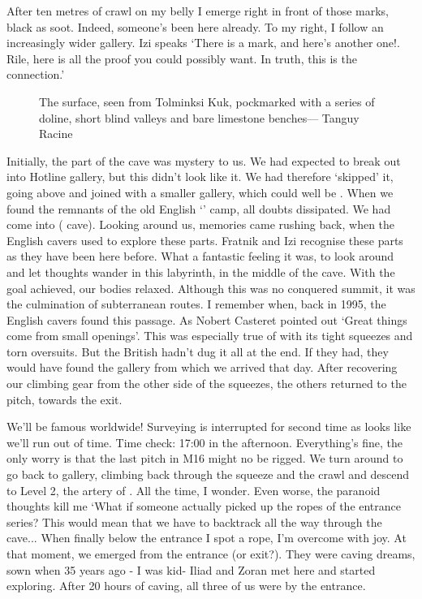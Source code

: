 After ten metres of crawl on my belly I emerge right in front of those marks, black as soot. Indeed, someone's been here already. To my right, I follow an increasingly wider gallery. Izi speaks `There is a mark, and here's another one!. Rile, here is all the proof you could possibly want. In truth, this is the connection.'


 \begin{figure}[t!]
\checkoddpage \ifoddpage \forcerectofloat \else \forceversofloat \fi
\centering
{}
\caption{The \protect{} surface, seen from Tolminksi Kuk, pockmarked with a series of doline, short blind valleys and bare limestone benches--- Tanguy Racine }
\label{mig seen from kuk}
\end{figure}


 Initially, the part of the cave was mystery to us. We had expected to break out into Hotline gallery, but this didn't look like it. We had therefore `skipped' it, going above and joined with a smaller gallery, which could well be . When we found the remnants of the old English `' camp, all doubts dissipated. We had come into  ( cave). Looking around us, memories came rushing back, when the English cavers used to explore these parts. Fratnik and Izi recognise these parts as they have been here before. What a fantastic feeling it was, to look around and let thoughts wander in this labyrinth, in the middle of the cave. With the goal achieved, our bodies relaxed. Although this was no conquered summit, it was the culmination of subterranean routes. I remember when, back in 1995, the English cavers found this passage. As Nobert Casteret pointed out `Great things come from small openings'. This was especially true of with its tight squeezes and torn oversuits. But the British hadn't dug it all at the end. If they had, they would have found the gallery from which we arrived that day. After recovering our climbing gear from the other side of the squeezes, the others returned to the pitch, towards the exit.

 We'll be famous worldwide! Surveying is interrupted for second time as looks like we'll run out of time. Time check: 17:00 in the afternoon. Everything's fine, the only worry is that the last pitch in M16 might no be rigged. We turn around to go back to  gallery, climbing back through the squeeze and the crawl and descend to Level 2, the artery of .  All the time, I wonder. Even worse, the paranoid thoughts kill me `What if someone actually picked up the ropes of the entrance series? This would mean that we have to backtrack all the way through the cave... When finally below the entrance I spot a rope, I'm overcome with joy. At that moment, we emerged from the entrance (or exit?). They were caving dreams, sown when 35 years ago - I was kid- Iliad and Zoran met here and started exploring. After 20 hours of caving, all three of us were by the entrance.
 

